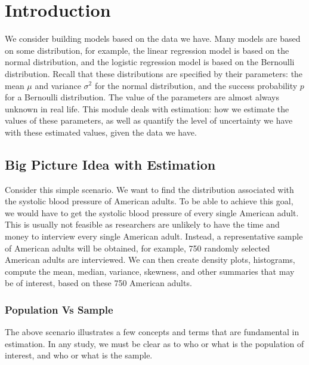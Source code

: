 \documentclass[
]{book}
\begin{document}
\hypertarget{introduction-3}{%
\section{Introduction}\label{introduction-3}}

We consider building models based on the data we have. Many models are based on some distribution, for example, the linear regression model is based on the normal distribution, and the logistic regression model is based on the Bernoulli distribution. Recall that these distributions are specified by their parameters: the mean \(\mu\) and variance \(\sigma^2\) for the normal distribution, and the success probability \(p\) for a Bernoulli distribution. The value of the parameters are almost always unknown in real life. This module deals with estimation: how we estimate the values of these parameters, as well as quantify the level of uncertainty we have with these estimated values, given the data we have.

\hypertarget{big-picture-idea-with-estimation}{%
\subsection{Big Picture Idea with Estimation}\label{big-picture-idea-with-estimation}}

Consider this simple scenario. We want to find the distribution associated with the systolic blood pressure of American adults. To be able to achieve this goal, we would have to get the systolic blood pressure of every single American adult. This is usually not feasible as researchers are unlikely to have the time and money to interview every single American adult. Instead, a representative sample of American adults will be obtained, for example, 750 randomly selected American adults are interviewed. We can then create density plots, histograms, compute the mean, median, variance, skewness, and other summaries that may be of interest, based on these 750 American adults.

\hypertarget{population-vs-sample}{%
\subsubsection{Population Vs Sample}\label{population-vs-sample}}

The above scenario illustrates a few concepts and terms that are fundamental in estimation. In any study, we must be clear as to who or what is the population of interest, and who or what is the sample.
\end{document}
